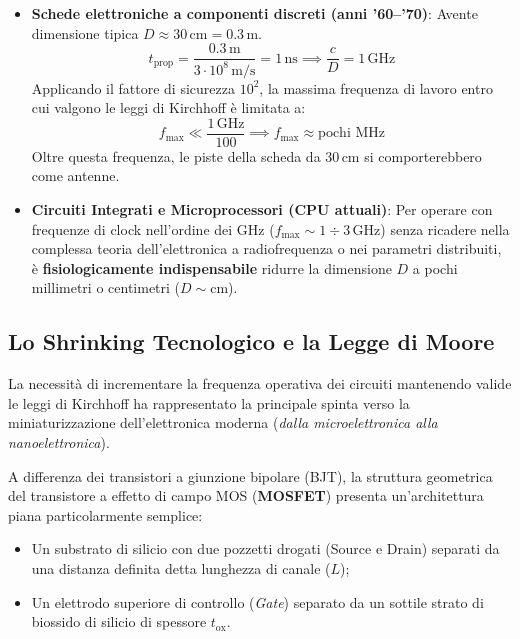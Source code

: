 \documentclass[12pt, a4paper]{report}
\begin{document}
\begin{itemize}
    \item \textbf{Schede elettroniche a componenti discreti (anni '60--'70)}:
    Avente dimensione tipica $D \approx 30\,\mathrm{cm} = 0.3\,\mathrm{m}$.
    \begin{equation}
        t_{\text{prop}} = \frac{0.3\,\mathrm{m}}{3 \cdot 10^8\,\mathrm{m/s}} = 1\,\mathrm{ns} \implies \frac{c}{D} = 1\,\mathrm{GHz}
    \end{equation}
    Applicando il fattore di sicurezza $10^2$, la massima frequenza di lavoro entro cui valgono le leggi di Kirchhoff è limitata a:
    \begin{equation}
        f_{\text{max}} \ll \frac{1\,\mathrm{GHz}}{100} \implies f_{\text{max}} \approx \text{pochi } \mathrm{MHz}
    \end{equation}
    Oltre questa frequenza, le piste della scheda da $30\,\mathrm{cm}$ si comporterebbero come antenne.
    
    \item \textbf{Circuiti Integrati e Microprocessori (CPU attuali)}:
    Per operare con frequenze di clock nell'ordine dei $\mathrm{GHz}$ ($f_{\text{max}} \sim 1 \div 3\,\mathrm{GHz}$) senza ricadere nella complessa teoria dell'elettronica a radiofrequenza o nei parametri distribuiti, è \textbf{fisiologicamente indispensabile} ridurre la dimensione $D$ a pochi millimetri o centimetri ($D \sim \mathrm{cm}$).
\end{itemize}

\subsection{Lo Shrinking Tecnologico e la Legge di Moore}
La necessità di incrementare la frequenza operativa dei circuiti mantenendo valide le leggi di Kirchhoff ha rappresentato la principale spinta verso la miniaturizzazione dell'elettronica moderna (\textit{dalla microelettronica alla nanoelettronica}).

A differenza dei transistori a giunzione bipolare (BJT), la struttura geometrica del transistore a effetto di campo MOS (\textbf{MOSFET}) presenta un'architettura piana particolarmente semplice:
\begin{itemize}
    \item Un substrato di silicio con due pozzetti drogati (Source e Drain) separati da una distanza definita detta lunghezza di canale ($L$);
    \item Un elettrodo superiore di controllo (\textit{Gate}) separato da un sottile strato di biossido di silicio di spessore $t_{\text{ox}}$.
\end{itemize}
\end{document}
